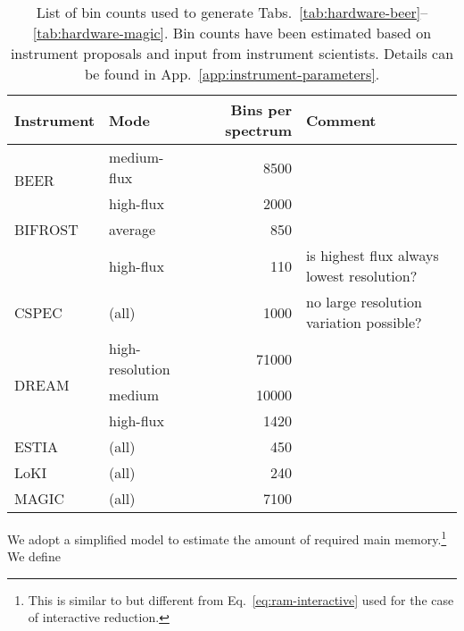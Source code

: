 \documentclass[a4paper,english,numbers=noenddot,bibliography=totoc,chapterprefix=on,DIV=12]{scrartcl}
\newcommand{\beer}{BEER\xspace}
\newcommand{\bifrost}{BIFROST\xspace}
\newcommand{\cspec}{CSPEC\xspace}
\newcommand{\dream}{DREAM\xspace}
\newcommand{\estia}{ESTIA\xspace}
\newcommand{\loki}{LoKI\xspace}
\newcommand{\magic}{MAGIC\xspace}
\begin{document}
\begin{table}
  \centering
  \begin{tabular}{llrl}
    Instrument & Mode & Bins per spectrum & Comment \\
    \hline
    \hline
    \multirow{2}{*}{\beer}
    & medium-flux & 8500 \\
    & high-flux & 2000 \\
    \hline
    \multirow{1}{*}{\bifrost}
    & average & 850\\
    & high-flux & 110 & is highest flux always lowest resolution?\\
    \hline
    \multirow{1}{*}{\cspec}
    & (all) & 1000 & no large resolution variation possible? \\
    \hline
    \multirow{3}{*}{\dream}
    & high-resolution & 71000 \\
    & medium & 10000 \\
    & high-flux & 1420 \\
    \hline
    \multirow{1}{*}{\estia}
    & (all) & 450 \\
    \hline
    \multirow{1}{*}{\loki}
    & (all)    & 240 \\
    \hline
    \multirow{1}{*}{\magic}
    & (all) & 7100 \\
    \hline
  \end{tabular}
  \caption{\label{tab:resolution}
List of bin counts used to generate Tabs.~\ref{tab:hardware-beer}--\ref{tab:hardware-magic}.
Bin counts have been estimated based on instrument proposals and input from instrument scientists.
Details can be found in App.~\ref{app:instrument-parameters}.
}
\end{table}

We adopt a simplified model to estimate the amount of required main memory.\footnote{This is similar to but different from Eq.~\eqref{eq:ram-interactive} used for the case of interactive reduction.}
We define
\end{document}
